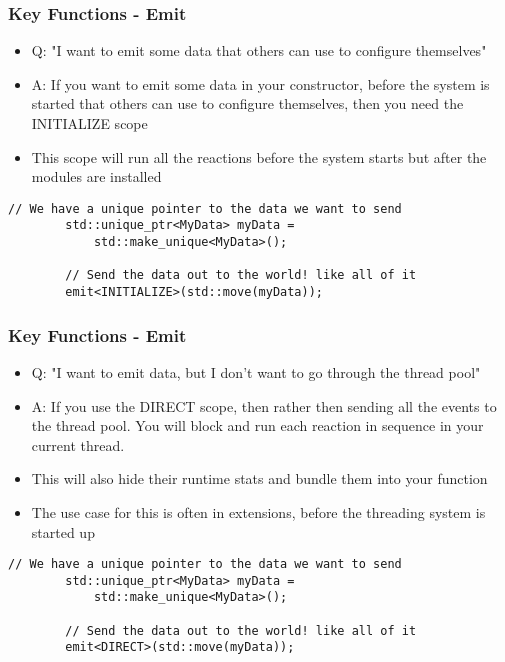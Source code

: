 \documentclass{beamer}
\begin{document}
\begin{frame}[fragile]
	\frametitle{Key Functions - Emit}
	\begin{itemize}
		\item Q: "I want to emit some data that others can use to configure themselves"
		\item A: If you want to emit some data in your constructor, before the system is started that others can use to configure themselves, then you need the INITIALIZE scope
		\item This scope will run all the reactions before the system starts but after the modules are installed
	\end{itemize}

	\begin{lstlisting}[language=nuclear]
		// We have a unique pointer to the data we want to send
		std::unique_ptr<MyData> myData =
		    std::make_unique<MyData>();

		// Send the data out to the world! like all of it
		emit<INITIALIZE>(std::move(myData));
	\end{lstlisting}
\end{frame}

\begin{frame}[fragile]
	\frametitle{Key Functions - Emit}
	\begin{itemize}
		\item Q: "I want to emit data, but I don't want to go through the thread pool"
		\item A: If you use the DIRECT scope, then rather then sending all the events to the thread pool. You will block and run each reaction in sequence in your current thread.
		\item This will also hide their runtime stats and bundle them into your function
		\item The use case for this is often in extensions, before the threading system is started up
	\end{itemize}

	\begin{lstlisting}[language=nuclear]
		// We have a unique pointer to the data we want to send
		std::unique_ptr<MyData> myData =
		    std::make_unique<MyData>();

		// Send the data out to the world! like all of it
		emit<DIRECT>(std::move(myData));
	\end{lstlisting}
\end{frame}
\end{document}
